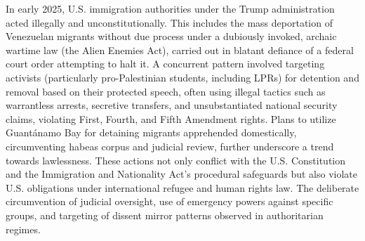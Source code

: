 \documentclass[11pt, letterpaper]{article}
\begin{document}
In early 2025, U.S. immigration authorities under the Trump administration acted illegally and unconstitutionally. This includes the mass deportation of Venezuelan migrants without due process under a dubiously invoked, archaic wartime law (the Alien Enemies Act), carried out in blatant defiance of a federal court order attempting to halt it. A concurrent pattern involved targeting activists (particularly pro-Palestinian students, including LPRs) for detention and removal based on their protected speech, often using illegal tactics such as warrantless arrests, secretive transfers, and unsubstantiated national security claims, violating First, Fourth, and Fifth Amendment rights. Plans to utilize Guantánamo Bay for detaining migrants apprehended domestically, circumventing habeas corpus and judicial review, further underscore a trend towards lawlessness. These actions not only conflict with the U.S. Constitution and the Immigration and Nationality Act's procedural safeguards but also violate U.S. obligations under international refugee and human rights law. The deliberate circumvention of judicial oversight, use of emergency powers against specific groups, and targeting of dissent mirror patterns observed in authoritarian regimes.

\vspace{1em} %
\end{document}
